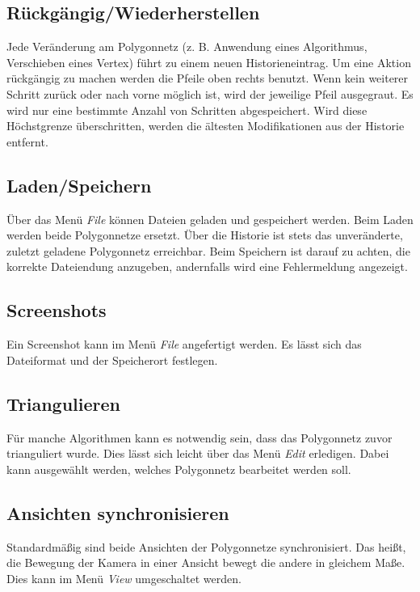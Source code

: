 \subsection{Rückgängig/Wiederherstellen}

Jede Veränderung am Polygonnetz (z. B. Anwendung eines Algorithmus, Verschieben eines Vertex) führt zu einem neuen Historieneintrag. 
Um eine Aktion rückgängig zu machen werden die Pfeile oben rechts benutzt.
Wenn kein weiterer Schritt zurück oder nach vorne möglich ist, wird der jeweilige Pfeil ausgegraut.
Es wird nur eine bestimmte Anzahl von Schritten abgespeichert.
Wird diese Höchstgrenze überschritten, werden die ältesten Modifikationen aus der Historie entfernt.

\subsection{Laden/Speichern}

Über das Menü \emph{File} können Dateien geladen und gespeichert werden.
Beim Laden werden beide Polygonnetze ersetzt.
Über die Historie ist stets das unveränderte, zuletzt geladene Polygonnetz erreichbar.
Beim Speichern ist darauf zu achten, die korrekte Dateiendung anzugeben, andernfalls wird eine Fehlermeldung angezeigt.

\subsection{Screenshots}

Ein Screenshot kann im Menü \emph{File} angefertigt werden. 
Es lässt sich das Dateiformat und der Speicherort festlegen.

\subsection{Triangulieren}

Für manche Algorithmen kann es notwendig sein, dass das Polygonnetz zuvor trianguliert wurde.
Dies lässt sich leicht über das Menü \emph{Edit} erledigen.
Dabei kann ausgewählt werden, welches Polygonnetz bearbeitet werden soll.

\subsection{Ansichten synchronisieren}

Standardmäßig sind beide Ansichten der Polygonnetze synchronisiert.
Das heißt, die Bewegung der Kamera in einer Ansicht bewegt die andere in gleichem Maße.
Dies kann im Menü \emph{View} umgeschaltet werden.

